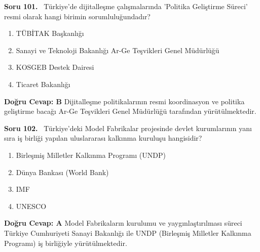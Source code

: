 \documentclass[11pt,a4paper,openany]{book}
\begin{document}
\needspace{5cm}
\vspace{8pt}
\noindent\textbf{\large\sffamily Soru 101.} \ Türkiye'de dijitalleşme çalışmalarında 'Politika Geliştirme Süreci' resmi olarak hangi birimin sorumluluğundadır?
\begin{enumerate}[label=\Alph*), leftmargin=25pt, topsep=4pt, itemsep=2pt]
    \item TÜBİTAK Başkanlığı
    \item Sanayi ve Teknoloji Bakanlığı Ar-Ge Teşvikleri Genel Müdürlüğü
    \item KOSGEB Destek Dairesi
    \item Ticaret Bakanlığı
\end{enumerate}
\vspace{4pt}
\begin{tcolorbox}[title=Cevap ve Açıklama, colback=gray!3!white, colframe=primarycolor!90!black, arc=2mm, fonttitle=\bfseries\sffamily, top=6pt, bottom=6pt]
    \textbf{Doğru Cevap: B}
    \vspace{2pt}
    Dijitalleşme politikalarının resmi koordinasyon ve politika geliştirme bacağı Ar-Ge Teşvikleri Genel Müdürlüğü tarafından yürütülmektedir.
\end{tcolorbox}
\vspace{10pt}

\needspace{5cm}
\vspace{8pt}
\noindent\textbf{\large\sffamily Soru 102.} \ Türkiye'deki Model Fabrikalar projesinde devlet kurumlarının yanı sıra iş birliği yapılan uluslararası kalkınma kuruluşu hangisidir?
\begin{enumerate}[label=\Alph*), leftmargin=25pt, topsep=4pt, itemsep=2pt]
    \item Birleşmiş Milletler Kalkınma Programı (UNDP)
    \item Dünya Bankası (World Bank)
    \item IMF
    \item UNESCO
\end{enumerate}
\vspace{4pt}
\begin{tcolorbox}[title=Cevap ve Açıklama, colback=gray!3!white, colframe=primarycolor!90!black, arc=2mm, fonttitle=\bfseries\sffamily, top=6pt, bottom=6pt]
    \textbf{Doğru Cevap: A}
    \vspace{2pt}
    Model Fabrikaların kurulumu ve yaygınlaştırılması süreci Türkiye Cumhuriyeti Sanayi Bakanlığı ile UNDP (Birleşmiş Milletler Kalkınma Programı) iş birliğiyle yürütülmektedir.
\end{tcolorbox}
\vspace{10pt}
\end{document}
